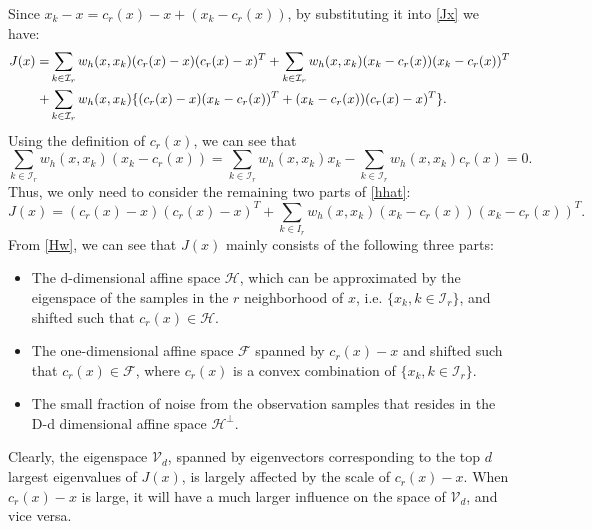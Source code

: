 \documentclass[aos,preprint]{imsart}
\theoremstyle{remark}
\begin{document}
Since $x_k -x = c_r(x) -x + (x_k - c_r(x))$, by substituting it into \eqref{Jx} we have:
\begin{equation}\label{hhat}
\small{
\begin{aligned}
J(x) = &\sum_{k\in {\mathcal I}_r} w_h(x, x_k) (c_r(x) - x)(c_r(x)-x)^T + \sum_{k\in {\mathcal I}_r} w_h(x, x_k) (x_k-c_r(x)) (x_k-c_r(x))^T\\
+&\sum_{k\in {\mathcal I}_r } w_h(x, x_k)\{(c_r(x)-x) (x_k-c_r(x))^T+ (x_k-c_r(x))(c_r(x)-x)^T\}.\\
\end{aligned}}
\end{equation}
Using the definition of $c_r(x)$, we can see that
\[
\sum_{k\in {\mathcal I}_r} w_h(x, x_k) (x_k -c_r(x)) = \sum_{k\in {\mathcal I}_r} w_h(x, x_k) x_k -\sum_{k\in {\mathcal I}_r} w_h(x, x_k) c_r(x) = 0.
\]
Thus, we only need to consider the remaining two parts of \eqref{hhat}:
\begin{equation}\label{Hw}
J(x) = (c_r(x) - x)(c_r(x)-x)^T + \sum_{k\in I_r} w_h(x, x_k) (x_k-c_r(x)) (x_k-c_r(x))^T.
\end{equation}
From \eqref{Hw}, we can see that $J(x)$  mainly consists of the following three parts:
\begin{itemize}
\item The d-dimensional affine space $\mathcal H$, which can be approximated by the eigenspace of the samples in the $r$ neighborhood of $x$, i.e. $\{x_k, k\in {\mathcal I}_r\}$, and shifted such that $c_r(x)\in \mathcal H$.
\item The one-dimensional affine space $\mathcal F$ spanned by $c_r(x)-x$ and shifted such that $c_r(x)\in \mathcal F$, where $c_r(x)$ is a convex combination of $\{x_k, k\in {\mathcal I}_r\}$.
\item The small fraction of noise from the observation samples that resides in the D-d dimensional affine space ${\mathcal H}^\perp$.
\end{itemize}
Clearly, the eigenspace ${\mathcal V}_d$, spanned by eigenvectors corresponding to the top $d$ largest eigenvalues of $J(x)$, is largely affected by the scale of $c_r(x)-x$. When $c_r(x)-x$ is large, it will have a much larger influence on the space of ${\mathcal V}_d$, and vice versa.
\end{document}
